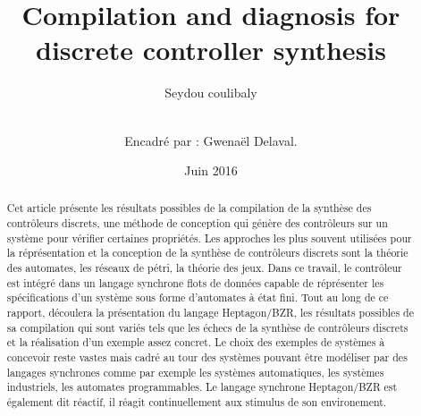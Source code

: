 \documentclass{svjour3}
\begin{document}
\title{Compilation and diagnosis for discrete controller synthesis}


\author{Seydou coulibaly  \\ \and \\
        Encadré par : Gwenaël Delaval.
}



\date{Juin 2016}

\maketitle

\begin{abstract}
Cet article présente les résultats possibles de la compilation de la synthèse des contrôleurs discrets, une méthode
de conception qui génère des contrôleurs sur un système pour vérifier certaines propriétés. Les approches les plus souvent utilis\'ees pour la réprésentation et la 
conception de la synthèse de contrôleurs discrets sont la th\'eorie des automates, les r\'eseaux de pétri, la th\'eorie des jeux. Dans ce travail, le contrôleur est intégré dans un langage
synchrone flots de données capable de réprésenter les spécifications d'un système sous forme d'automates à état fini. Tout au long de ce rapport, d\'ecoulera la présentation du langage Heptagon/BZR, les résultats possibles de sa 
compilation qui sont variés tels que les échecs de la synthèse de contrôleurs discrets et la réalisation d'un exemple assez concret. Le choix des exemples de syst\`emes \`a concevoir reste vastes mais cadr\'e au 
tour des syst\`emes pouvant \^etre mod\'eliser par des langages synchrones comme par exemple les syst\`emes automatiques, les syst\`emes industriels, 
les automates programmables. Le langage synchrone Heptagon/BZR est \'egalement dit r\'eactif, il réagit continuellement aux stimulus de son environement.

\end{abstract}
\newpage
\end{document}
